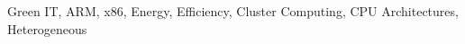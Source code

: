 \begin{IEEEkeywords}
	Green IT, ARM, x86, Energy, Efficiency, Cluster Computing, CPU Architectures, Heterogeneous
\end{IEEEkeywords}
